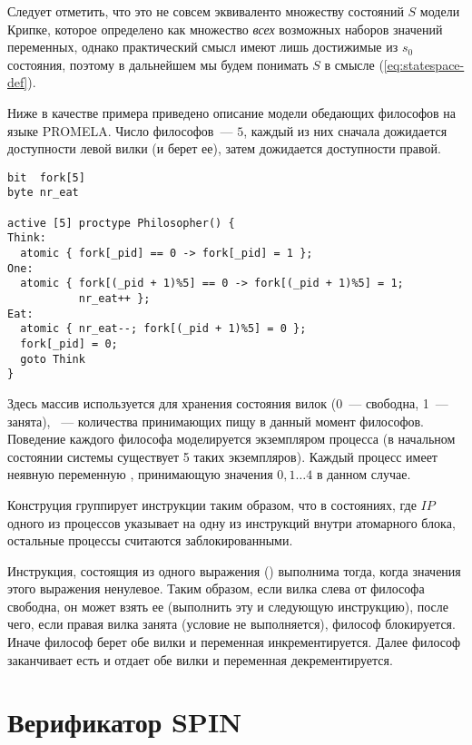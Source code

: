 Следует отметить, что это не совсем эквиваленто множеству состояний $S$ модели Крипке, которое
определено как множество \emph{всех} возможных наборов значений переменных, однако
практический смысл имеют лишь достижимые из $s_0$ состояния, поэтому в дальнейшем мы будем
понимать $S$ в смысле (\ref{eq:statespace-def}).

Ниже в качестве примера приведено описание модели обедающих философов на языке
PROMELA. Число философов~--- $5$, каждый из них сначала дожидается доступности левой вилки
(и берет ее), затем дожидается доступности правой.

\label{code:philo}

\begin{lstlisting}[float,language=Promela,style=simplecode,caption={Пример описания модели
    на языке PROMELA}]
bit  fork[5]
byte nr_eat

active [5] proctype Philosopher() {
Think:
  atomic { fork[_pid] == 0 -> fork[_pid] = 1 };
One:
  atomic { fork[(_pid + 1)%5] == 0 -> fork[(_pid + 1)%5] = 1; 
           nr_eat++ };
Eat:
  atomic { nr_eat--; fork[(_pid + 1)%5] = 0 };
  fork[_pid] = 0;
  goto Think
}  
\end{lstlisting}

Здесь массив  используется для хранения состояния вилок (0~--- свободна, 1~---
занята), ~--- количества принимающих пищу в данный момент
философов. Поведение каждого философа моделируется экземпляром процесса 
(в начальном состоянии системы существует 5 таких экземпляров). Каждый процесс имеет
неявную переменную , принимающую значения $0, 1 \ldots 4$ в данном случае.

Конструция  группирует инструкции таким образом, что в состояниях, где $IP$
одного из процессов указывает на одну из инструкций внутри атомарного блока, остальные
процессы считаются заблокированными.

Инструкция, состоящия из одного выражения () выполнима тогда, когда
значения этого выражения ненулевое. Таким образом, если вилка слева от философа свободна,
он может взять ее (выполнить эту и следующую инструкцию), после чего, если правая вилка
занята (условие  не выполняется), философ
блокируется. Иначе философ берет обе вилки и переменная 
инкрементируется. Далее философ заканчивает есть и отдает обе вилки и переменная
 декрементируется.

\section{Верификатор SPIN}
\label{sec:spin}

